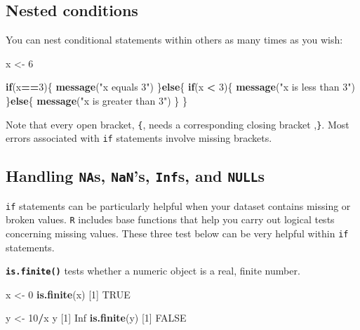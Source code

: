 \documentclass[]{book}
\newenvironment{Shaded}{\begin{snugshade}}{\end{snugshade}}
\newcommand{\ControlFlowTok}[1]{\textcolor[rgb]{0.13,0.29,0.53}{\textbf{#1}}}
\newcommand{\DecValTok}[1]{\textcolor[rgb]{0.00,0.00,0.81}{#1}}
\newcommand{\KeywordTok}[1]{\textcolor[rgb]{0.13,0.29,0.53}{\textbf{#1}}}
\newcommand{\NormalTok}[1]{#1}
\newcommand{\OperatorTok}[1]{\textcolor[rgb]{0.81,0.36,0.00}{\textbf{#1}}}
\newcommand{\OtherTok}[1]{\textcolor[rgb]{0.56,0.35,0.01}{#1}}
\newcommand{\StringTok}[1]{\textcolor[rgb]{0.31,0.60,0.02}{#1}}
\begin{document}
\hypertarget{nested-conditions}{%
\subsection*{Nested conditions}\label{nested-conditions}}

You can nest conditional statements within others as many times as you wish:

\begin{Shaded}
\begin{Highlighting}[]
\NormalTok{x <-}\StringTok{ }\DecValTok{6}

\ControlFlowTok{if}\NormalTok{(x}\OperatorTok{==}\DecValTok{3}\NormalTok{)\{}
  \KeywordTok{message}\NormalTok{(}\StringTok{"x equals 3"}\NormalTok{)}
\NormalTok{\}}\ControlFlowTok{else}\NormalTok{\{}
  \ControlFlowTok{if}\NormalTok{(x }\OperatorTok{<}\StringTok{ }\DecValTok{3}\NormalTok{)\{}
    \KeywordTok{message}\NormalTok{(}\StringTok{"x is less than 3"}\NormalTok{)}
\NormalTok{  \}}\ControlFlowTok{else}\NormalTok{\{  }
    \KeywordTok{message}\NormalTok{(}\StringTok{"x is greater than 3"}\NormalTok{)}
\NormalTok{  \}}
\NormalTok{\}}
\end{Highlighting}
\end{Shaded}

Note that every open bracket, \texttt{\{}, needs a corresponding closing bracket ,\texttt{\}}. Most errors associated with \texttt{if} statements involve missing brackets.

\hypertarget{handling-nas-nans-infs-and-nulls}{%
\subsection*{\texorpdfstring{Handling \texttt{NA}s, \texttt{NaN}'s, \texttt{Inf}s, and \texttt{NULL}s}{Handling NAs, NaN's, Infs, and NULLs}}\label{handling-nas-nans-infs-and-nulls}}

\texttt{if} statements can be particularly helpful when your dataset contains missing or broken values. \texttt{R} includes base functions that help you carry out logical tests concerning missing values. These three test below can be very helpful within \texttt{if} statements.

\textbf{\texttt{is.finite()}} tests whether a numeric object is a real, finite number.

\begin{Shaded}
\begin{Highlighting}[]
\NormalTok{x <-}\StringTok{ }\DecValTok{0}
\KeywordTok{is.finite}\NormalTok{(x)}
\NormalTok{[}\DecValTok{1}\NormalTok{] }\OtherTok{TRUE}

\NormalTok{y <-}\StringTok{ }\DecValTok{10}\OperatorTok{/}\NormalTok{x}
\NormalTok{y}
\NormalTok{[}\DecValTok{1}\NormalTok{] }\OtherTok{Inf}
\KeywordTok{is.finite}\NormalTok{(y)}
\NormalTok{[}\DecValTok{1}\NormalTok{] }\OtherTok{FALSE}
\end{Highlighting}
\end{Shaded}
\end{document}
